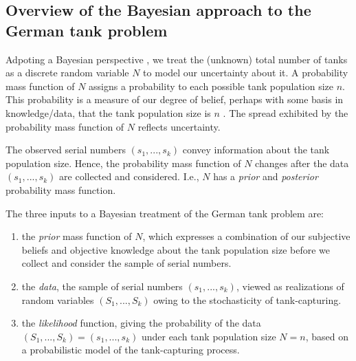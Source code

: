 \documentclass[11pt, oneside]{article}
\newcommand{\data}{$(s_1, ..., s_k)$\xspace}
\begin{document}
\subsection{Overview of the Bayesian approach to the German tank problem}
Adpoting a Bayesian perspective \cite{bolstad2016introduction,downey2021think,van2021bayesian}, we treat the (unknown) total number of tanks as a discrete random variable $N$ to model our uncertainty about it. A probability mass function of $N$ assigns a probability to each possible tank population size $n$. This probability is a measure of our degree of belief, perhaps with some basis in knowledge/data, that the tank population size is $n$ \cite{ghosh2006introduction}. The spread exhibited by the probability mass function of $N$ reflects uncertainty. 

The observed serial numbers \data convey information about the tank population size. Hence, the probability mass function of $N$ changes after the data \data are collected and considered. I.e., $N$ has a \emph{prior} and \emph{posterior} probability mass function.

The three inputs to a Bayesian treatment of the German tank problem are: 
\begin{enumerate}
	\item the \emph{prior} mass function of $N$, which expresses a combination of our subjective beliefs and objective knowledge about the tank population size before we collect and consider the sample of serial numbers.
	\item the \emph{data}, the sample of serial numbers \data, viewed as realizations of random variables $(S_1, ..., S_k)$ owing to the stochasticity of tank-capturing.
	\item the \emph{likelihood} function, giving the probability of the data $(S_1, ..., S_k)=(s_1,...,s_k)$ under each tank population size $N=n$, based on a probabilistic model of the tank-capturing process.
\end{enumerate}
\end{document}
